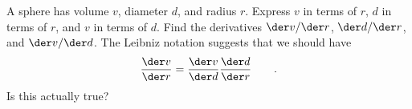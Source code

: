 A sphere has volume $v$, diameter $d$, and radius $r$.
Express $v$ in terms of $r$,
$d$ in terms of $r$, and
$v$ in terms of $d$.
Find the derivatives $\der v/\der r$, $\der d/\der r$, and $\der v/\der d$.
The Leibniz notation suggests that we should have
\begin{equation*}
  \frac{\der v}{\der r} = \frac{\der v}{\der d}  \frac{\der d}{\der r}   \qquad .
\end{equation*}
Is this actually true?
